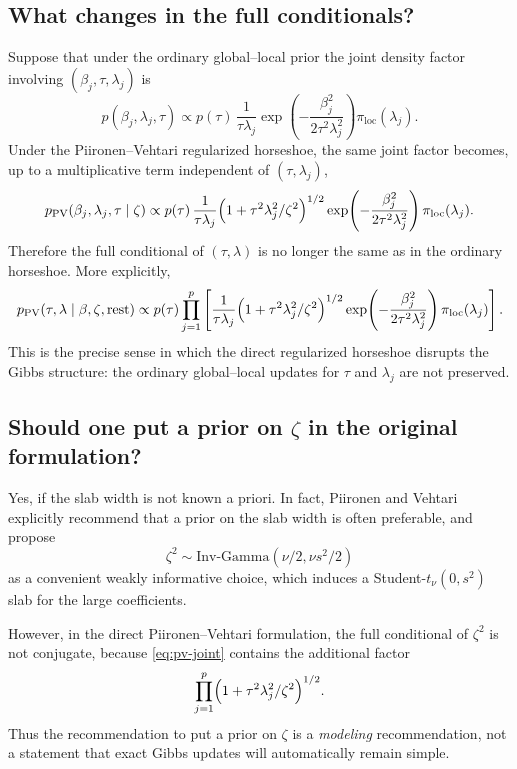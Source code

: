 \documentclass[11pt]{article}
\newcommand{\IG}{\mathrm{Inv\mbox{-}Gamma}}
\newcommand{\PV}{\mathrm{PV}}
\newcommand{\Loc}{\pi_{\mathrm{loc}}}
\begin{document}
\subsection{What changes in the full conditionals?}

Suppose that under the ordinary global--local prior the joint density factor involving $(\beta_j,\tau,\lambda_j)$ is
\[
p(\beta_j,\lambda_j,\tau)
\propto
p(\tau)\,
\frac{1}{\tau\lambda_j}
\exp\!\left(-\frac{\beta_j^2}{2\tau^2\lambda_j^2}\right)\Loc(\lambda_j).
\]
Under the Piironen--Vehtari regularized horseshoe, the same joint factor becomes, up to a multiplicative term independent of $(\tau,\lambda_j)$,
\begin{equation}
p_{\PV}(\beta_j,\lambda_j,\tau \mid \zeta)
\propto
p(\tau)\,
\frac{1}{\tau\lambda_j}
\Bigl(1+\tau^2\lambda_j^2/\zeta^2\Bigr)^{1/2}
\exp\!\left(-\frac{\beta_j^2}{2\tau^2\lambda_j^2}\right)\Loc(\lambda_j).
\label{eq:pv-joint}
\end{equation}
Therefore the full conditional of $(\tau,\lambda)$ is no longer the same as in the ordinary horseshoe. More explicitly,
\begin{equation}
p_{\PV}(\tau,\lambda \mid \beta,\zeta,\text{rest})
\propto
p(\tau)
\prod_{j=1}^p
\left[
\frac{1}{\tau\lambda_j}
\Bigl(1+\tau^2\lambda_j^2/\zeta^2\Bigr)^{1/2}
\exp\!\left(-\frac{\beta_j^2}{2\tau^2\lambda_j^2}\right)
\Loc(\lambda_j)
\right].
\label{eq:pv-block}
\end{equation}
This is the precise sense in which the direct regularized horseshoe disrupts the Gibbs structure: the ordinary global--local updates for $\tau$ and $\lambda_j$ are not preserved.

\subsection{Should one put a prior on $\zeta$ in the original formulation?}

Yes, if the slab width is not known a priori. In fact, Piironen and Vehtari explicitly recommend that a prior on the slab width is often preferable, and propose
\begin{equation}
\zeta^2 \sim \IG(\nu/2,\nu s^2/2)
\label{eq:pv-zeta-prior}
\end{equation}
as a convenient weakly informative choice, which induces a Student-$t_\nu(0,s^2)$ slab for the large coefficients.

However, in the direct Piironen--Vehtari formulation, the full conditional of $\zeta^2$ is not conjugate, because \eqref{eq:pv-joint} contains the additional factor
\[
\prod_{j=1}^p \Bigl(1+\tau^2\lambda_j^2/\zeta^2\Bigr)^{1/2}.
\]
Thus the recommendation to put a prior on $\zeta$ is a \emph{modeling} recommendation, not a statement that exact Gibbs updates will automatically remain simple.
\end{document}
